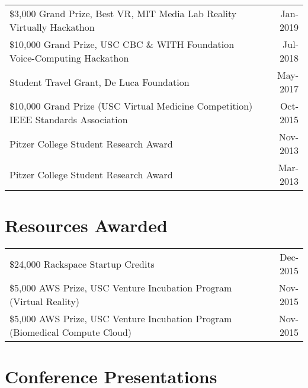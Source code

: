 \documentclass[10pt,a4paper]{article}
\begin{document}
  \vspace*{1mm}\noindent\begin{tabularx}{17cm}{X r}
    \$3,000 Grand Prize, Best VR, MIT Media Lab Reality Virtually Hackathon & Jan-2019\\ %
  	\$10,000 Grand Prize, USC CBC \& WITH Foundation Voice-Computing Hackathon & Jul-2018\\ %
    Student Travel Grant, De Luca Foundation & May-2017\\ %
    \$10,000 Grand Prize (USC Virtual Medicine Competition) IEEE Standards Association  & Oct-2015\\ %
    Pitzer College Student Research Award & Nov-2013 \\
    Pitzer College Student Research Award & Mar-2013 \\

  \end{tabularx}

\vspace*{2mm}\section*{Resources Awarded}
  
  \vspace*{1mm}\noindent\begin{tabularx}{17cm}{X r}

    \$24,000 Rackspace Startup Credits & Dec-2015\\
    \$5,000 AWS Prize, USC Venture Incubation Program (Virtual Reality) & Nov-2015\\
    \$5,000 AWS Prize, USC Venture Incubation Program (Biomedical Compute Cloud) & Nov-2015\\

  \end{tabularx}

\newpage
  \vspace*{2mm}\section*{\textbf{Conference Presentations}}
\end{document}
